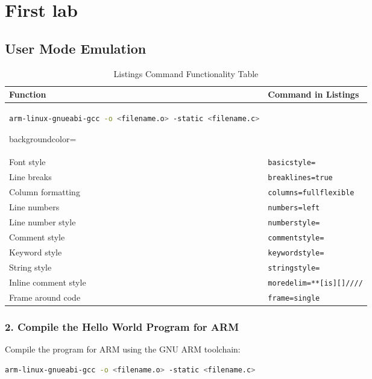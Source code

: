 \chapter{First lab}
\section{User Mode Emulation}

\begin{table}[htbp]
    \centering
    \begin{tabular}{|l|l|}
        \hline
        \textbf{Function} & \textbf{Command in Listings} \\
        \hline
        \begin{lstlisting}[language=bash]
            arm-linux-gnueabi-gcc -o <filename.o> -static <filename.c>
            \end{lstlisting}
        {backgroundcolor=\color{gray!10}} \\
        \hline
        Font style & \texttt{basicstyle=\ttfamily\footnotesize} \\
        \hline
        Line breaks & \texttt{breaklines=true} \\
        \hline
        Column formatting & \texttt{columns=fullflexible} \\
        \hline
        Line numbers & \texttt{numbers=left} \\
        \hline
        Line number style & \texttt{numberstyle=\tiny\color{gray}} \\
        \hline
        Comment style & \texttt{commentstyle=\color{green}} \\
        \hline
        Keyword style & \texttt{keywordstyle=\color{blue}\bfseries} \\
        \hline
        String style & \texttt{stringstyle=\color{red}} \\
        \hline
        Inline comment style & \texttt{moredelim=**[is][\color{gray}]{//}{//}} \\
        \hline
        Frame around code & \texttt{frame=single} \\
        \hline
    \end{tabular}
    \caption{Listings Command Functionality Table}
\end{table}
\subsection*{2. Compile the Hello World Program for ARM}
Compile the program for ARM using the GNU ARM toolchain:
\begin{lstlisting}[language=bash]
arm-linux-gnueabi-gcc -o <filename.o> -static <filename.c>
\end{lstlisting}

